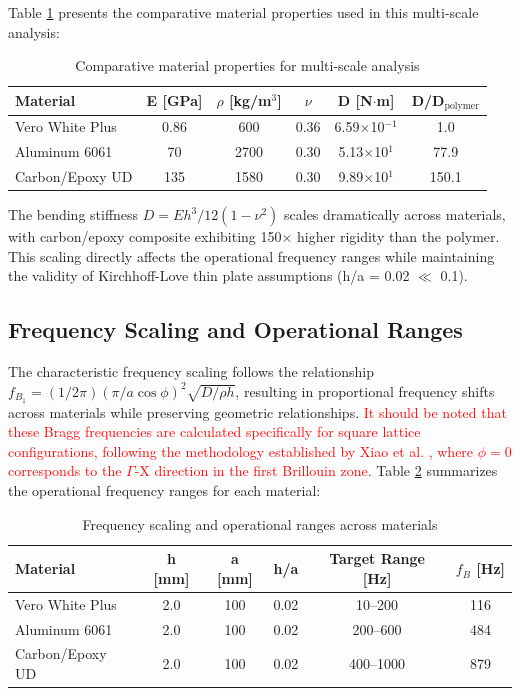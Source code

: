 \documentclass[review,numbers,sort&compress]{elsarticle}
\begin{document}
{Table \ref{tab:material_properties_comparison} presents the comparative material properties used in this multi-scale analysis:

\begin{table}[!htb]
\centering
\caption{Comparative material properties for multi-scale analysis}
\label{tab:material_properties_comparison}
\small
\begin{tabular}{lccccc}
\hline
Material & E [GPa] & $\rho$ [kg/m$^3$] & $\nu$ & D [N$\cdot$m] & D/D$_{\text{polymer}}$ \\
\hline
Vero White Plus & 0.86 & 600 & 0.36 & 6.59$\times$10$^{-1}$ & 1.0 \\
Aluminum 6061 & 70 & 2700 & 0.30 & 5.13$\times$10$^{1}$ & 77.9 \\
Carbon/Epoxy UD & 135 & 1580 & 0.30 & 9.89$\times$10$^{1}$ & 150.1 \\
\hline
\end{tabular}
\end{table}

The bending stiffness $D = Eh^3/12(1-\nu^2)$ scales dramatically across materials, with carbon/epoxy composite exhibiting 150× higher rigidity than the polymer. This scaling directly affects the operational frequency ranges while maintaining the validity of Kirchhoff-Love thin plate assumptions (h/a = 0.02 $\ll$ 0.1).

\subsection{Frequency Scaling and Operational Ranges}

The characteristic frequency scaling follows the relationship $f_{B_1} = (1/2\pi)(\pi/a\cos\phi)^2 \sqrt{D/\rho h}$, resulting in proportional frequency shifts across materials while preserving geometric relationships. \textcolor{red}{It should be noted that these Bragg frequencies are calculated specifically for square lattice configurations, following the methodology established by Xiao et al. \cite{Xiao_2012}, where $\phi = 0$ corresponds to the $\Gamma$-X direction in the first Brillouin zone.} Table \ref{tab:frequency_scaling} summarizes the operational frequency ranges for each material:

\begin{table}[!htb]
\centering
\caption{Frequency scaling and operational ranges across materials}
\label{tab:frequency_scaling}
\small
\begin{tabular}{lccccc}
\hline
Material & h [mm] & a [mm] & h/a & Target Range [Hz] & $f_B$ [Hz] \\
\hline
Vero White Plus & 2.0 & 100 & 0.02 & 10--200 & 116 \\
Aluminum 6061 & 2.0 & 100 & 0.02 & 200--600 & 484 \\
Carbon/Epoxy UD & 2.0 & 100 & 0.02 & 400--1000 & 879 \\
\hline
\end{tabular}
\end{table}

}
\end{document}
